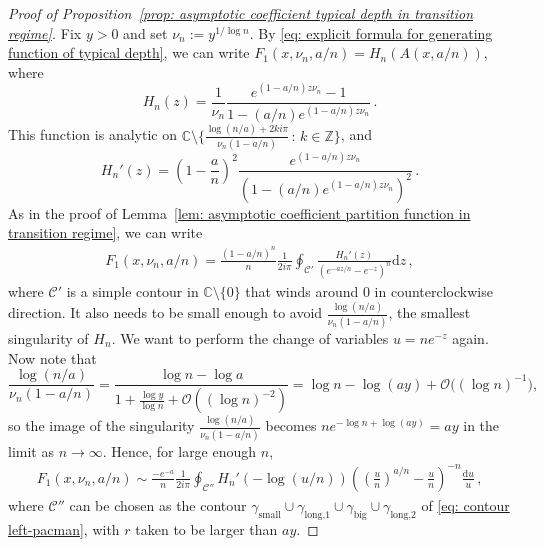 \documentclass{article}
\theoremstyle{remark}
\newcommand{\bZ}{\mathbb{Z}}
\newcommand{\bC}{\mathbb{C}}
\newcommand{\cO}{\mathcal{O}}
\newcommand{\cC}{\mathcal{C}}
\begin{document}
\begin{proof}[Proof of Proposition~\ref{prop: asymptotic coefficient typical depth in transition regime}]
    Fix $y>0$ and set $\nu_n := y^{1/\log n}$.
    By \eqref{eq: explicit formula for generating function of typical depth}, we can write $F_1\left(x, \nu_n, a/n\right) = H_n(A(x,a/n))$, where
    \begin{equation*}
        H_n(z) = \frac{1}{\nu_n}\frac{e^{(1-a/n)z\nu_n} - 1}{1 - (a/n)e^{(1-a/n)z\nu_n}} \,.
    \end{equation*}
    This function is analytic on $\bC \setminus \{\frac{\log(n/a) + 2ki\pi}{\nu_n(1-a/n)}\,:\, k \in \bZ\}$, and
    \begin{equation*}
        H_n'(z) = \left(1-\frac{a}{n}\right)^2 \frac{e^{(1-a/n)z\nu_n}}{\left( 1-(a/n)e^{(1-a/n)z\nu_n} \right)^2} \,.
    \end{equation*}
    As in the proof of Lemma~\ref{lem: asymptotic coefficient partition function in transition regime}, we can write
    \begin{align*}
        [x^n] F_1\left(x, \nu_n, a/n\right)
        = \frac{(1-a/n)^n}{n} \frac{1}{2i\pi} \oint_{\cC'} \frac{H_n'(z)}{\left( e^{-az/n} - e^{-z} \right)^n} \mathrm{d}z\,,
    \end{align*}
    where $\cC'$ is a simple contour in $\bC \setminus \{0\}$ that winds around $0$ in counterclockwise direction. It also needs to be small enough to avoid $\frac{\log(n/a)}{\nu_n(1-a/n)}$, the smallest singularity of $H_n$.
    We want to perform the change of variables $u = ne^{-z}$ again. Now note that
    \begin{equation*}
        \frac{\log(n/a)}{\nu_n(1-a/n)} = \frac{\log n - \log a}{1 + \frac{\log y}{\log n} + \cO((\log n)^{-2})} = \log n - \log (ay) + \cO\big((\log n)^{-1} \big),
    \end{equation*}
    so the image of the singularity $\frac{\log(n/a)}{\nu_n(1-a/n)}$ becomes $ne^{-\log n + \log(ay)} = ay$ in the limit as $n\to\infty$. Hence, for large enough $n$,
    \begin{align*}
        [x^n] F_1\left(x, \nu_n, a/n\right)
        \sim \frac{-e^{-a}}{n} \frac{1}{2i\pi} \oint_{\cC''} H_n'\left(-\log(u/n)\right) \left( \left(\frac{u}{n}\right)^{a/n} - \frac{u}{n} \right)^{-n} \frac{\mathrm{d}u}{u}\,,
    \end{align*}
    where $\cC''$ can be chosen as the contour $\gamma_\text{small}  \cup \gamma_\text{long,1} \cup \gamma_\text{big} \cup \gamma_\text{long,2}$ of \eqref{eq: contour left-pacman}, with $r$ taken to be larger than $ay$.

\end{proof}
\end{document}
